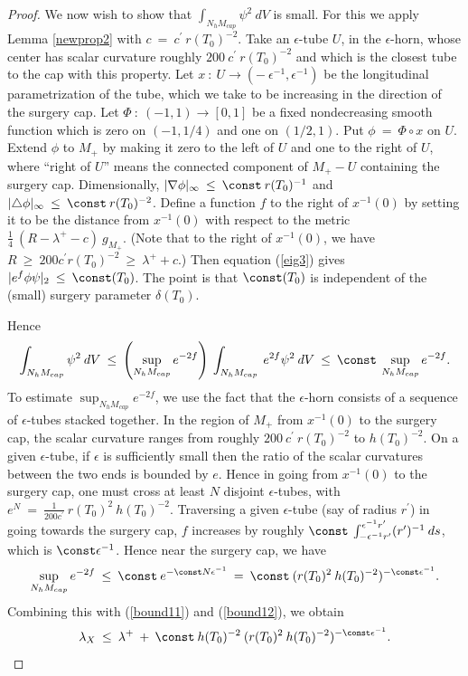 \begin{proof}
We now wish to show that $\int_{N_h M_{cap}} \psi^2 \: dV$ is small.
For this we apply Lemma \ref{newprop2} with
$c \: = \: c^\prime \: r(T_0)^{-2}$. Take an $\epsilon$-tube $U$,
in the $\epsilon$-horn,
whose center has scalar curvature roughly $200 \: c^\prime \: r(T_0)^{-2}$
and which is the closest tube to the cap with this property.
Let $x \: : \: U \rightarrow
(- \: \epsilon^{-1}, \epsilon^{-1})$
be the longitudinal parametrization of the tube,
which we take to be increasing in the direction of the surgery cap.
Let $\Phi \: : \: (-1, 1) \rightarrow [0,1]$
be a fixed nondecreasing smooth function which is zero on $(-1, 1/4)$ and one on
$(1/2, 1)$. Put $\phi \: = \: \Phi \circ x$ on $U$.
Extend $\phi$ to $M_+$ by making it zero to the left of $U$ and one to the right of $U$,
where ``right of $U$'' means the connected component of $M_+ - U$ containing the
surgery cap.
Dimensionally, $|\nabla \phi|_\infty \: \le \: \const \:
r(T_0)^{-1}$ and $|\triangle \phi|_\infty \: \le \: \const \:  r(T_0)^{-2}$.
Define a function $f$ to the right of $x^{-1}(0)$ by setting it to be the distance from $x^{-1}(0)$
with respect to the metric $\frac14 \: (R - \lambda^+ - c) \: g_{M_+}$.
(Note that to the right of $x^{-1}(0)$, we have
$R \: \ge \: 200 c^\prime r(T_0)^{-2} \: \ge \: \lambda^+ + c$.)
Then
equation (\ref{eig3}) gives
$|e^f \phi \psi|_2 \: \le \: \const (T_0)$. The point is that $\const (T_0)$ is independent
of the (small) surgery parameter $\delta(T_0)$.

Hence
\begin{equation} \label{bound12}
\int_{N_h M_{cap}} \psi^2 \: dV \: \le \:
\left( \sup_{N_h M_{cap}} e^{-2f} \right) \:
\int_{N_h M_{cap}} \: e^{2f} \psi^2 \: dV \: \le \:
\const \: \sup_{N_h M_{cap}} e^{-2f}.
\end{equation}
To estimate $\sup_{N_h M_{cap}} e^{-2f}$, we use the fact that
the $\epsilon$-horn consists of a
sequence of $\epsilon$-tubes stacked together.  In the
region of $M_+$ from $x^{-1}(0)$ to the surgery cap, the scalar curvature
ranges from roughly $200 \: c^\prime \: r(T_0)^{-2}$
to $h(T_0)^{-2}$.
On a given
$\epsilon$-tube, if $\epsilon$ is sufficiently small then
the ratio of the scalar curvatures between the
two ends is bounded by $e$. Hence in going
from $x^{-1}(0)$ to the surgery cap,
one must cross at least $N$ disjoint $\epsilon$-tubes,
with $e^N \: = \: \frac{1}{200 c^\prime} \: r(T_0)^2 \: h(T_0)^{-2}$.
Traversing a given $\epsilon$-tube (say of
radius $r^\prime$) in going towards the surgery cap, $f$ increases by
roughly $\const \: \int_{- \epsilon^{-1}r^\prime}^{\epsilon^{-1}r^\prime}
(r^\prime)^{-1} \: ds$, which is $\const \epsilon^{-1}$. Hence near
the surgery cap, we have
\begin{equation}
\sup_{N_h M_{cap}} e^{-2f} \: \le \: \const \: e^{-\const N \epsilon^{-1}}
\: = \: \const \: (r(T_0)^2 \: h(T_0)^{-2})^{-\const \epsilon^{-1}}.
\end{equation}
Combining this with (\ref{bound11}) and (\ref{bound12}), we obtain
\begin{equation}
\lambda_X \: \le \: \lambda^+ \: + \: \const \: h(T_0)^{-2} \:
(r(T_0)^2 \: h(T_0)^{-2})^{- \const \epsilon^{-1}}.
\end{equation}



\end{proof}
